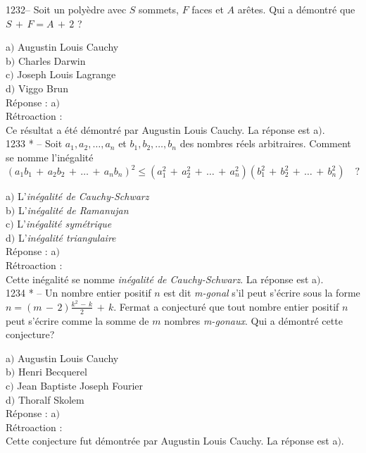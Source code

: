 ﻿\documentclass[letterpaper, 12pt]{article}
\begin{document}
1232-- Soit un poly\`edre avec $S$ sommets, $F$ faces et $A$
ar\^etes. Qui a d\'emontr\'e que $S\,+\,F=A\,+\,2$ ?

a$)$ Augustin Louis Cauchy \\
b$)$ Charles Darwin \\
c$)$ Joseph Louis Lagrange \\
d$)$ Viggo Brun\\

R\'eponse : a$)$\\

R\'etroaction : \\
Ce r\'esultat a \'et\'e d\'emontr\'e par Augustin Louis Cauchy.
La r\'eponse est a$)$.\\

1233 * -- Soit $a_1,a_2,\ldots,a_n$ et $b_1,b_2,\ldots,b_n$ des nombres
r\'eels arbitraires. Comment se nomme l'in\'egalit\'e
$$(a_1b_1\,+\,a_2b_2\,+\,\ldots\,+\,a_nb_n)^2\le(a_1^2\,+\,a_2^2\,+\,\ldots\,+\,a_n^2)(b_1^2\,+\,b_2^2\,+\,\ldots\,+\,b_n^2)\quad?$$

a$)$ L'{\sl in\'egalit\'e de Cauchy-Schwarz} \\
b$)$ L'{\sl in\'egalit\'e de Ramanujan} \\
c$)$ L'{\sl in\'egalit\'e sym\'etrique} \\
d$)$ L'{\sl in\'egalit\'e triangulaire}\\

R\'eponse : a$)$\\

R\'etroaction : \\
Cette in\'egalit\'e se nomme {\sl in\'egalit\'e de Cauchy-Schwarz}.
La r\'eponse est a$)$.\\

1234 * -- Un nombre entier positif $n$ est dit {\sl m-gonal} s'il
peut s'\'ecrire sous la forme
$\displaystyle{n=(m\,-\,2)\frac{k^2\,-\,k}2\,+\,k}$. Fermat a
conjectur\'e que tout nombre entier positif $n$ peut s'\'ecrire
comme la somme de $m$ nombres {\sl m-gonaux}. Qui a d\'emontr\'e
cette conjecture?

a$)$ Augustin Louis Cauchy \\
b$)$ Henri Becquerel \\
c$)$ Jean Baptiste Joseph Fourier \\
d$)$ Thoralf Skolem\\

R\'eponse : a$)$\\

R\'etroaction : \\
Cette conjecture fut d\'emontr\'ee par Augustin Louis Cauchy.
La r\'eponse est a$)$.\\
\end{document}
